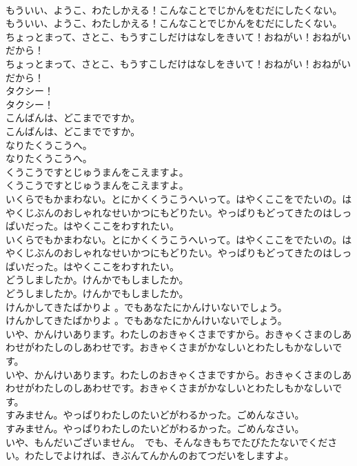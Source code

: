 \documentclass[8pt]{extreport}
\begin{document}
\begin{CJK}{UTF8}{min}
\\	もういい、ようこ、わたしかえる！こんなことでじかんをむだにしたくない。	
\\	もういい、ようこ、わたしかえる！こんなことでじかんをむだにしたくない。 
\\	ちょっとまって、さとこ、もうすこしだけはなしをきいて！おねがい！おねがいだから！	
\\	ちょっとまって、さとこ、もうすこしだけはなしをきいて！おねがい！おねがいだから！ 
\\	タクシー！	
\\	タクシー！ 
\\	こんばんは、どこまでですか。	
\\	こんばんは、どこまでですか。 
\\	なりたくうこうへ。	
\\	なりたくうこうへ。 
\\	くうこうですとじゅうまんをこえますよ。	
\\	くうこうですとじゅうまんをこえますよ。 
\\	いくらでもかまわない。とにかくくうこうへいって。はやくここをでたいの。はやくじぶんのおしゃれなせいかつにもどりたい。やっぱりもどってきたのはしっぱいだった。はやくここをわすれたい。	
\\	いくらでもかまわない。とにかくくうこうへいって。はやくここをでたいの。はやくじぶんのおしゃれなせいかつにもどりたい。やっぱりもどってきたのはしっぱいだった。はやくここをわすれたい。 
\\	どうしましたか。けんかでもしましたか。	
\\	どうしましたか。けんかでもしましたか。 
\\	けんかしてきたばかりよ 。でもあなたにかんけいないでしょう。	
\\	けんかしてきたばかりよ 。でもあなたにかんけいないでしょう。 
\\	いや、かんけいあります。わたしのおきゃくさまですから。おきゃくさまのしあわせがわたしのしあわせです。おきゃくさまがかなしいとわたしもかなしいです。	
\\	いや、かんけいあります。わたしのおきゃくさまですから。おきゃくさまのしあわせがわたしのしあわせです。おきゃくさまがかなしいとわたしもかなしいです。 
\\	すみません。やっぱりわたしのたいどがわるかった。ごめんなさい。	
\\	すみません。やっぱりわたしのたいどがわるかった。ごめんなさい。 
\\	いや、もんだいございません。　でも、そんなきもちでたびたたないでください。わたしでよければ、きぶんてんかんのおてつだいをしますよ。	

\end{CJK}
\end{document}
